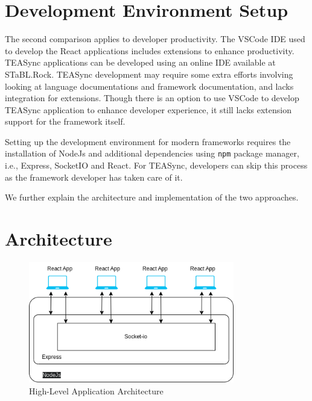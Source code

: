 \section{Development Environment Setup}

The second comparison applies to developer productivity. The VSCode IDE used to develop the React applications includes extensions to enhance productivity. TEASync applications can be developed using an online IDE available at STaBL.Rock. TEASync development may require some extra efforts involving looking at language documentations and framework documentation, and lacks integration for extensions. Though there is an option to use VSCode to develop TEASync application to enhance developer experience, it still lacks extension support for the framework itself. 

Setting up the development environment for modern frameworks requires the installation of NodeJs and additional dependencies using \lstinline{npm} package manager, i.e., Express, SocketIO and React. For TEASync, developers can skip this process as the framework developer has taken care of it.


We further explain the architecture and implementation of the two approaches.

\section{Architecture}
\label{subsection:architecture}

\begin{figure}[ht]
    \centering
    \includegraphics[width=0.8\textwidth]{diagrams/App Architecture.png}
    \caption{High-Level Application Architecture}
    \label{fig:ReactFlow}
\end{figure}

